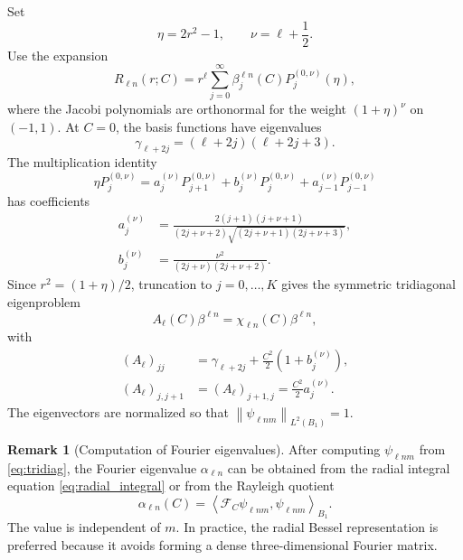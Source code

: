 \documentclass[11pt]{article}
\numberwithin{equation}{section}
\newcommand{\F}{\mathcal{F}}
\newcommand{\norm}[1]{\left\lVert #1\right\rVert}
\newcommand{\inner}[2]{\left\langle #1,#2\right\rangle}
\theoremstyle{plain}
\theoremstyle{definition}
\newtheorem{remark}[theorem]{Remark}
\begin{document}
Set
\begin{equation*}
  \eta=2r^2-1,
  \qquad
  \nu=\ell+\frac12 .
\end{equation*}
Use the expansion
\begin{equation*}
  R_{\ell n}(r;C)=r^\ell\sum_{j=0}^{\infty}\beta_j^{\ell n}(C)P_j^{(0,\nu)}(\eta),
\end{equation*}
where the Jacobi polynomials are orthonormal for the weight $(1+\eta)^\nu$ on $(-1,1)$.  At $C=0$, the basis functions have eigenvalues
\begin{equation*}
  \gamma_{\ell+2j}=(\ell+2j)(\ell+2j+3).
\end{equation*}
The multiplication identity
\begin{equation*}
  \eta P_j^{(0,\nu)}=a_j^{(\nu)}P_{j+1}^{(0,\nu)}+b_j^{(\nu)}P_j^{(0,\nu)}+a_{j-1}^{(\nu)}P_{j-1}^{(0,\nu)}
\end{equation*}
has coefficients
\begin{align*}
  a_j^{(\nu)}&=\frac{2(j+1)(j+\nu+1)}{(2j+\nu+2)\sqrt{(2j+\nu+1)(2j+\nu+3)}},\\
  b_j^{(\nu)}&=\frac{\nu^2}{(2j+\nu)(2j+\nu+2)}.
\end{align*}
Since $r^2=(1+\eta)/2$, truncation to $j=0,\ldots,K$ gives the symmetric tridiagonal eigenproblem
\begin{equation}\label{eq:tridiag}
  A_\ell(C)\beta^{\ell n}=\chi_{\ell n}(C)\beta^{\ell n},
\end{equation}
with
\begin{align*}
  (A_\ell)_{jj}
  &=\gamma_{\ell+2j}+\frac{C^2}{2}\left(1+b_j^{(\nu)}\right),\\
  (A_\ell)_{j,j+1}
  &=(A_\ell)_{j+1,j}=\frac{C^2}{2}a_j^{(\nu)}.
\end{align*}
The eigenvectors are normalized so that $\norm{\psi_{\ell n m}}_{L^2(B_1)}=1$.

\begin{remark}[Computation of Fourier eigenvalues]
After computing $\psi_{\ell n m}$ from \eqref{eq:tridiag}, the Fourier eigenvalue $\alpha_{\ell n}$ can be obtained from the radial integral equation \eqref{eq:radial_integral} or from the Rayleigh quotient
\begin{equation*}
  \alpha_{\ell n}(C)=\inner{\F_C\psi_{\ell n m}}{\psi_{\ell n m}}_{B_1}.
\end{equation*}
The value is independent of $m$.  In practice, the radial Bessel representation is preferred because it avoids forming a dense three-dimensional Fourier matrix.
\end{remark}
\end{document}
